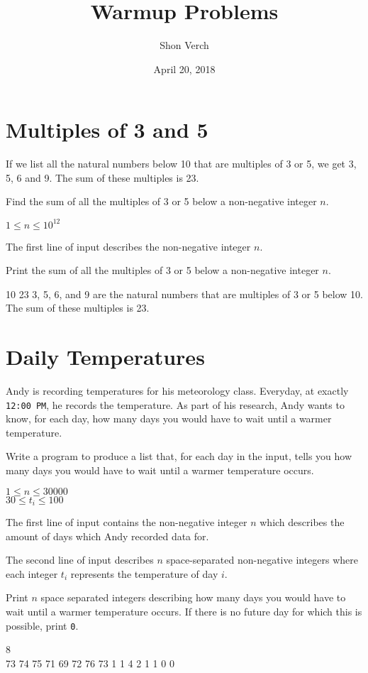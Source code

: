\documentclass{problem-set}
\title{Warmup Problems}
\date{April 20, 2018}
\author{Shon Verch}
\begin{document}
\maketitle

\section{Multiples of 3 and 5}
If we list all the natural numbers below 10 that are multiples of 3 or 5, we get 3, 5, 6 and 9. The sum of these multiples is 23.

Find the sum of all the multiples of 3 or 5 below a non-negative integer $n$.

\constraints
$1 \leq n \leq 10^{12}$

The first line of input describes the non-negative integer $n$.

\outputformat
Print the sum of all the multiples of 3 or 5 below a non-negative integer $n$.

\addsampleExplanation
{
10
}
{
23
}
{
3, 5, 6, and 9 are the natural numbers that are multiples of 3 or 5 below 10. The sum of these multiples is 23.
}

\newpage\section{Daily Temperatures}
Andy is recording temperatures for his meteorology class. Everyday, at exactly \texttt{12:00 PM}, he records the temperature. As part of his research, Andy wants to know, for each day, how many days you would have to wait until a warmer temperature.

Write a program to produce a list that, for each day in the input, tells you how many days you would have to wait until a warmer temperature occurs.

\constraints
$1 \leq n \leq 30000$\\
$30 \leq t_i \leq 100$

The first line of input contains the non-negative integer $n$ which describes the amount of days which Andy recorded data for.

The second line of input describes $n$ space-separated non-negative integers where each integer $t_i$ represents the temperature of day $i$.

\outputformat
Print $n$ space separated integers describing how many days you would have to wait until a warmer temperature occurs. If there is no future day for which this is possible, print \texttt{0}.

\addsample
{
8\\
73 74 75 71 69 72 76 73
}
{
1 1 4 2 1 1 0 0
}
\end{document}
